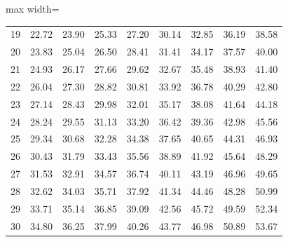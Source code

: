 \begin{center}
\begin{adjustbox}{max width=\linewidth}
\begin{tabular}{ccccccccc}
19 & 22.72 & 23.90 & 25.33 & 27.20 & 30.14 & 32.85 & 36.19 & 38.58 \\
20 & 23.83 & 25.04 & 26.50 & 28.41 & 31.41 & 34.17 & 37.57 & 40.00 \\
\midrule
21 & 24.93 & 26.17 & 27.66 & 29.62 & 32.67 & 35.48 & 38.93 & 41.40 \\
22 & 26.04 & 27.30 & 28.82 & 30.81 & 33.92 & 36.78 & 40.29 & 42.80 \\
23 & 27.14 & 28.43 & 29.98 & 32.01 & 35.17 & 38.08 & 41.64 & 44.18 \\
24 & 28.24 & 29.55 & 31.13 & 33.20 & 36.42 & 39.36 & 42.98 & 45.56 \\
25 & 29.34 & 30.68 & 32.28 & 34.38 & 37.65 & 40.65 & 44.31 & 46.93 \\
\midrule
26 & 30.43 & 31.79 & 33.43 & 35.56 & 38.89 & 41.92 & 45.64 & 48.29 \\
27 & 31.53 & 32.91 & 34.57 & 36.74 & 40.11 & 43.19 & 46.96 & 49.65 \\
28 & 32.62 & 34.03 & 35.71 & 37.92 & 41.34 & 44.46 & 48.28 & 50.99 \\
29 & 33.71 & 35.14 & 36.85 & 39.09 & 42.56 & 45.72 & 49.59 & 52.34 \\
30 & 34.80 & 36.25 & 37.99 & 40.26 & 43.77 & 46.98 & 50.89 & 53.67 \\
\bottomrule
\end{tabular}
\end{adjustbox}
\end{center}

\clearpage
